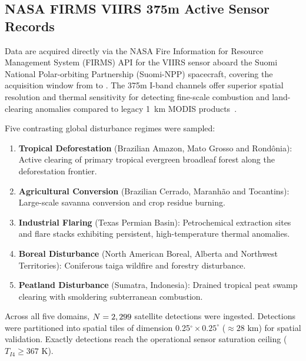 \documentclass[conference]{IEEEtran}
\begin{document}
\subsection{NASA FIRMS VIIRS 375m Active Sensor Records}
Data are acquired directly via the NASA Fire Information for Resource Management System (FIRMS) API for the VIIRS sensor aboard the Suomi National Polar-orbiting Partnership (Suomi-NPP) spacecraft, covering the acquisition window from \dateMin{} to \dateMax{}. The 375m I-band channels offer superior spatial resolution and thermal sensitivity for detecting fine-scale combustion and land-clearing anomalies compared to legacy 1~km MODIS products~\cite{giglio2016}.

Five contrasting global disturbance regimes were sampled:
\begin{enumerate}
    \item \textbf{Tropical Deforestation} (Brazilian Amazon, Mato Grosso and Rond\^{o}nia): Active clearing of primary tropical evergreen broadleaf forest along the deforestation frontier.
    \item \textbf{Agricultural Conversion} (Brazilian Cerrado, Maranh\~{a}o and Tocantins): Large-scale savanna conversion and crop residue burning.
    \item \textbf{Industrial Flaring} (Texas Permian Basin): Petrochemical extraction sites and flare stacks exhibiting persistent, high-temperature thermal anomalies.
    \item \textbf{Boreal Disturbance} (North American Boreal, Alberta and Northwest Territories): Coniferous taiga wildfire and forestry disturbance.
    \item \textbf{Peatland Disturbance} (Sumatra, Indonesia): Drained tropical peat swamp clearing with smoldering subterranean combustion.
\end{enumerate}
Across all five domains, $N = 2,299{}$ satellite detections were ingested. Detections were partitioned into \numSpatialTiles{} spatial tiles of dimension 0.25$^\circ \times 0.25^\circ$ ($\approx 28\text{ km}$) for spatial validation. Exactly \numSaturatedPixels{} detections reach the operational sensor saturation ceiling ($T_{I4} \ge 367\text{ K}$).
\end{document}
